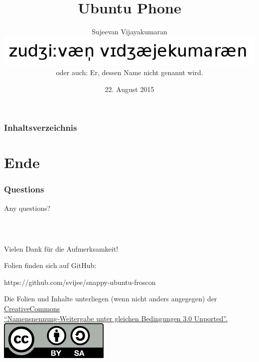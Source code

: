 \documentclass{beamer}
\title{Ubuntu Phone}
\author{Sujeevan Vijayakumaran\\
\includegraphics[width=0.3\linewidth]{images/name.png}\\
\tiny{oder auch: Er, dessen Name nicht genannt wird.}}
\date{22. August 2015}
\institute{FrOSCon}
\begin{document}
\maketitle
\begin{frame}
  \frametitle{Inhaltsverzeichnis}
  \tableofcontents
\end{frame}

\section{Ende}
\begin{frame}
  \frametitle{Questions}
  \large{Any questions?}
\end{frame}

\begin{frame}[c]
    \frametitle{~}

    \begin{center}
        Vielen Dank für die Aufmerksamkeit!
       
        Folien finden sich auf GitHub:

        https://github.com/svijee/snappy-ubuntu-froscon\\[5em]

        \begin{scriptsize}
            Die Folien und Inhalte unterliegen (wenn nicht anders angegegen) der
            \href{http://creativecommons.org/licenses/by-sa/3.0/deed.de}{CreativeCommons \\
            "`Namensnennung-Weitergabe unter gleichen Bedingungen 3.0 Unported"'.\\[1em]
            \includegraphics[scale=0.5]{images/cc-by-sa-gross.pdf}}\\[2em]
        \end{scriptsize}
    \end{center}

\end{frame}
\end{document}
